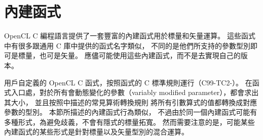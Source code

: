 \section{內建函式}

OpenCL C 編程語言提供了一套豐富的內建函式用於標量和矢量運算。
這些函式中有很多跟通用 C 庫中提供的函式名字類似，
不同的是他們所支持的參數型別即可是標量，也可是矢量。
應儘可能使用這些內建函式，而不是去實現自己的版本。

用戶自定義的 OpenCL C 函式，按照函式的 C 標準規則運行（C99-TC2-{}）。
在函式入口處，對於所有會動態變化的參數（variably modified parameter），都會求出其大小，
並且按照中描述的常見算術轉換規則
將所有引數算式的值都轉換成對應參數的型別。
本節所描述的內建函式行為類似，
不過由於同一個內建函式可能有多種形式，為避免歧義，不會有隱式的標量拓寬。
然而需要注意的是，可能某些內建函式的某些形式是針對標量以及矢量型別的混合運算。
















